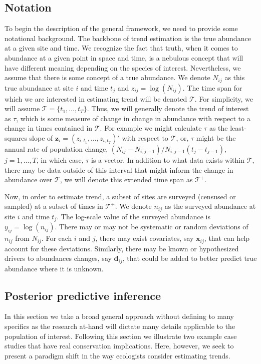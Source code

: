 \documentclass[12pt,letter]{article}
\newcommand{\Nij}{\ensuremath{N_{ij}}}
\newcommand{\nij}{\ensuremath{n_{ij}}}
\newcommand{\zij}{\ensuremath{z_{ij}}}
\newcommand{\yij}{\ensuremath{y_{ij}}}
\newcommand{\fT}{\ensuremath{\mathcal{T}}}
\newcommand{\fTp}{\ensuremath{\mathcal{T}^+}}
\newcommand{\bzi}{\ensuremath{\mathbf{z}_i}}
\newcommand{\bx}{\ensuremath{\mathbf{x}}}
\begin{document}
\subsection{Notation}

To begin the description of the general framework, we need to provide some notational background. The backbone of trend estimation is the true abundance at a given site and time. We recognize the fact that truth, when it comes to abundance at a given point in space and time, is a nebulous concept that will have different meaning depending on the species of interest. Nevertheless, we assume that there is some concept of a true abundance. We denote $\Nij$ as this true abundance at site $i$ and time $t_j$ and $\zij=\log(\Nij)$. The time span for which we are interested in estimating trend will be denoted $\fT$. For simplicity, we will assume $\fT = \{t_1,\dots,t_T\}$. Thus, we will generally denote the trend of interest as $\tau$, which is some measure of change in change in abundance with respect to a change in times contained in $\fT$. For example we might calculate $\tau$ as the least-squares slope of $\bzi = (z_{i,t_1},\dots,z_{i,t_T})'$ with respect to $\fT$, or, $\tau$ might be the annual rate of population change, $(\Nij-N_{i,j-1})/N_{i,j-1}(t_j-t_{j-1})$, $j=1,\dots,T$, in which case, $\tau$ is a vector. In addition to what data exists within $\fT$, there may be data outside of this interval that might inform the change in abundance over $\fT$, we will denote this extended time span as $\fTp$.

 Now, in order to estimate trend, a subset of sites are surveyed (censused or sampled) at a subset of times in $\fTp$. We denote $\nij$ as the surveyed abundance at site $i$ and time $t_j$. The log-scale value of the surveyed abundance is $\yij=\log(\nij)$. There may or may not be systematic or random deviations of $\nij$ from $\Nij$. For each $i$ and $j$, there may exist covariates, say $\bx_{ij}$, that can help account for these deviations. Similarly, there may be known or hypothesized drivers to abundances changes, say $\mathbf{d}_{ij}$, that could be added to better predict true abundance where it is unknown. 
 
\subsection{Posterior predictive inference}

In this section we take a broad general approach without defining to many specifics as the research at-hand will dictate many details applicable to the population of interest. Following this section we illustrate two example case studies that have real conservation implications. Here, however, we seek to present a paradigm shift in the way ecologists consider estimating trends. 
\end{document}
